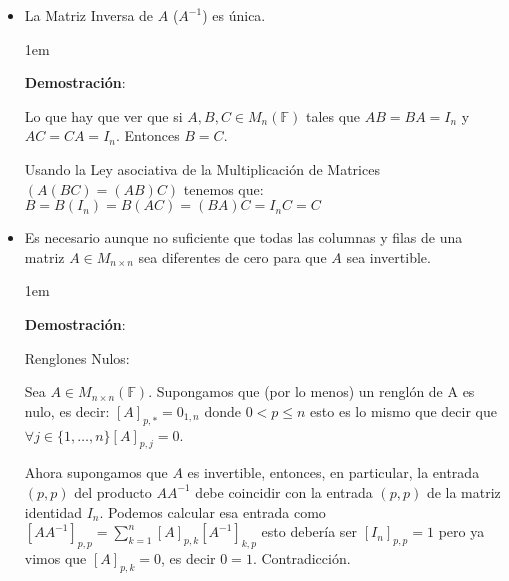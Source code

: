 \documentclass[12pt, fleqn]{report}                             %
\newenvironment{SmallIndentation}[1][0.75em]                    %
    {\begin{adjustwidth}{#1}{}\begin{footnotesize}}                 %
    {\end{footnotesize}\end{adjustwidth}}                           %
\begin{document}
                \begin{itemize}

                    \item La Matriz Inversa de $A$ ($A^{-1}$) es única.

                        \begin{SmallIndentation}[1em]
                            \textbf{Demostración}:

                            Lo que hay que ver que si $A,B,C \in M_n(\mathbb{F})$ tales que
                            $AB = BA = I_n$ y $AC = CA = I_n$. Entonces $B=C$.

                            Usando la Ley asociativa de la Multiplicación de Matrices $(A(BC)=(AB)C)$
                            tenemos que:
                            $B = B(I_n) = B(AC) = (BA)C = I_nC =  C $

                        \end{SmallIndentation}

                    \item Es necesario aunque no suficiente que todas las columnas y filas de una
                        matriz $A \in M_{n \times n}$ sea diferentes de cero para que $A$ sea invertible.

                        \begin{SmallIndentation}[1em]
                            \textbf{Demostración}:

                            Renglones Nulos:

                                Sea $A \in M_{n \times n}(\mathbb{F})$.
                                Supongamos que (por lo menos) un renglón de A es nulo, es decir:
                                $[A]_{p,*} = 0_{1,n}$ donde $0 < p \leq n$ esto es lo mismo que decir
                                que $\forall j \in \{1, \dots, n\} [A]_{p,j} = 0$.

                                Ahora supongamos que $A$ es invertible, entonces, en particular, la entrada
                                $(p,p)$ del producto $AA^{-1}$ debe coincidir con la entrada $(p,p)$ de la
                                matriz identidad $I_n$.
                                Podemos calcular esa entrada como
                                $[AA^{-1}]_{p,p} = \sum_{k=1}^{n} [A]_{p,k} [A^{-1}]_{k,p}$
                                esto debería ser $[I_n]_{p,p}=1$ pero ya vimos que $[A]_{p,k} = 0$, es decir
                                $0 = 1$. Contradicción.



\end{SmallIndentation}
\end{itemize}
\end{document}
